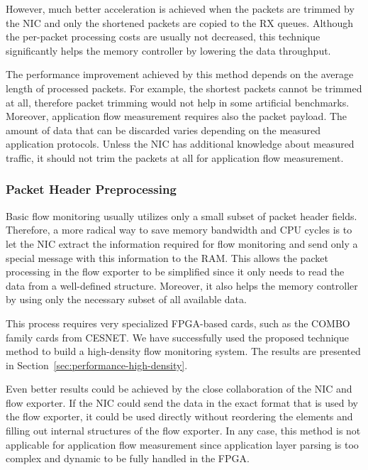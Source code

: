 However, much better acceleration is achieved when the packets are trimmed by the NIC and only the shortened packets are copied to the RX queues. Although the per-packet processing costs are usually not decreased, this technique significantly helps the memory controller by lowering the data throughput. 

The performance improvement achieved by this method depends on the average length of processed packets. For example, the shortest packets cannot be trimmed at all, therefore packet trimming would not help in some artificial benchmarks. Moreover, application flow measurement requires also the packet payload. The amount of data that can be discarded varies depending on the measured application protocols. Unless the NIC has additional knowledge about measured traffic, it should not trim the packets at all for application flow measurement.

\subsubsection{Packet Header Preprocessing}

Basic flow monitoring usually utilizes only a small subset of packet header fields. Therefore, a more radical way to save memory bandwidth and CPU cycles is to let the NIC extract the information required for flow monitoring and send only a special message with this information to the RAM. This allows the packet processing in the flow exporter to be simplified since it only needs to read the data from a well-defined structure. Moreover, it also helps the memory controller by using only the necessary subset of all available data.

This process requires very specialized FPGA-based cards, such as the COMBO family cards from CESNET. We have successfully used the proposed technique method to build a high-density flow monitoring system. The results are presented in Section~\ref{sec:performance-high-density}.

Even better results could be achieved by the close collaboration of the NIC and flow exporter. If the NIC could send the data in the exact format that is used by the flow exporter, it could be used directly without reordering the elements and filling out internal structures of the flow exporter. In any case, this method is not applicable for application flow measurement since application layer parsing is too complex and dynamic to be fully handled in the FPGA.

